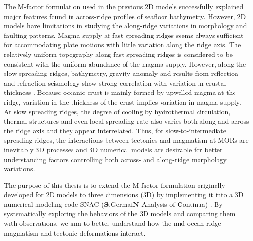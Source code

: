 The M-factor formulation used in the previous 2D models \citep[e.g.,][]{Tucholke2008,Buck2005} successfully explained major features found in across-ridge profiles of seafloor bathymetry. However, 2D models have limitations in studying the along-ridge variations in morphology and faulting patterns. Magma supply at fast spreading ridges seems always sufficient for accommodating plate motions with little variation along the ridge axis. The relatively uniform topography along fast spreading ridges is considered to be consistent with the uniform abundance of the magma supply. However, along the slow spreading ridges, bathymetry, gravity anomaly and results from reflection and refraction seismology show strong correlation with variation in crustal thickness \citep[e.g.,][]{Ryan2009, Chen1999, Lin1990, Tolstoy1993}. Because oceanic crust is mainly formed by upwelled magma at the ridge, variation in the thickness of the crust implies variation in magma supply. At slow spreading ridges, the degree of cooling by hydrothermal circulation, thermal structures and even local spreading rate \citep{Baines2008} also varies both along and across the ridge axis and they appear interrelated. Thus, for slow-to-intermediate spreading ridges, the interactions between tectonics and magmatism at MORs are inevitably 3D processes and 3D numerical models are desirable for better understanding factors controlling both across- and along-ridge morphology variations. 

The purpose of this thesis is to extend the M-factor formulation originally developed for 2D models to three dimensions (3D) by implementing it into a 3D numerical modeling code SNAC (\textbf{S}tGermai\textbf{N} \textbf{A}nalysis of \textbf{C}ontinua) \citep{Choi2008}. By systematically exploring the behaviors of the 3D models and comparing them with observations, we aim to better understand how the mid-ocean ridge magmatism and tectonic deformations interact. 


